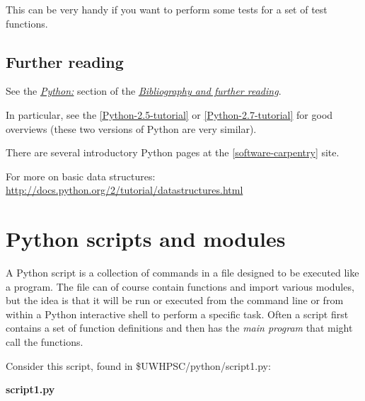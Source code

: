 \documentclass[letterpaper,10pt,english]{sphinxmanual}
\begin{document}
This can be very handy if you want to perform some tests for a set of test
functions.


\subsection{Further reading}
\label{python:further-reading}
See the {\hyperref[biblio:biblio-python]{\emph{Python:}}} section of the {\hyperref[biblio:biblio]{\emph{Bibliography and further reading}}}.

In particular,
see the {\hyperref[biblio:python-2-5-tutorial]{{[}Python-2.5-tutorial{]}}}  or {\hyperref[biblio:python-2-7-tutorial]{{[}Python-2.7-tutorial{]}}} for good overviews
(these two versions of Python are very similar).

There are several introductory Python pages at the {\hyperref[biblio:software-carpentry]{{[}software-carpentry{]}}}
site.

For more on basic data structures:
\href{http://docs.python.org/2/tutorial/datastructures.html}{http://docs.python.org/2/tutorial/datastructures.html}


\section{Python scripts and modules}
\label{python_scripts_modules:python-scripts-modules}\label{python_scripts_modules::doc}\label{python_scripts_modules:python-scripts-and-modules}
A Python script is a collection of commands in a file designed to be
executed like a program.  The file can of course contain functions and
import various modules, but the idea is that it will be run or executed
from the command line or from within a Python interactive shell to perform a
specific task.  Often a script first contains a set of function definitions
and then has the \emph{main program} that might call the functions.

Consider this script,  found in \$UWHPSC/python/script1.py:

\textbf{script1.py}
\end{document}
